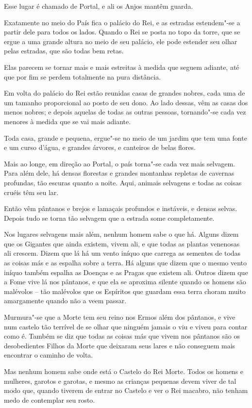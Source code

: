 Esse lugar é chamado de Portal, e ali os Anjos mantêm guarda.

Exatamente no meio do País fica o palácio do Rei, e as estradas
estendem"-se a partir dele para todos os lados. Quando o Rei se posta no
topo da torre, que se ergue a uma grande altura no meio de seu palácio,
ele pode estender seu olhar pelas estradas, que são todas bem retas.

Elas parecem se tornar mais e mais estreitas à medida que seguem
adiante, até que por fim se perdem totalmente na pura distância.

Em volta do palácio do Rei estão reunidas casas de grandes nobres, cada
uma de um tamanho proporcional ao posto de seu dono. Ao lado dessas, vêm
as casas dos menos nobres; e depois aquelas de todas as outras pessoas,
tornando"-se cada vez menores à medida que se vai mais adiante.

Toda casa, grande e pequena, ergue"-se no meio de um jardim que tem uma
fonte e um curso d'água, e grandes árvores, e canteiros de belas flores.

Mais ao longe, em direção ao Portal, o país torna"-se cada vez mais
selvagem. Para além dele, há densas florestas e grandes montanhas
repletas de cavernas profundas, tão escuras quanto a noite. Aqui,
animais selvagens e todas as coisas cruéis têm seu lar.

Então vêm pântanos e brejos e lamaçais profundos e instáveis, e densas
selvas. Depois tudo se torna tão selvagem que a estrada some
completamente.

Nos lugares selvagens mais além, nenhum homem sabe o que há. Alguns
dizem que os Gigantes que ainda existem, vivem ali, e que todas as
plantas venenosas ali crescem. Dizem que lá há um vento iníquo que
carrega as sementes de todas as coisas más e as espalha sobre a terra.
Há alguns que dizem que o mesmo vento iníquo também espalha as Doenças e
as Pragas que existem ali. Outros dizem que a Fome vive lá nos pântanos,
e que ela se aproxima silente quando os homens são malévolos -- tão
malévolos que os Espíritos que guardam essa terra choram muito
amargamente quando não a veem passar.

Murmura"-se que a Morte tem seu reino nos Ermos além dos pântanos, e vive
num castelo tão terrível de se olhar que ninguém jamais o viu e viveu
para contar como é. Também se diz que todas as coisas más que vivem nos
pântanos são os desobedientes Filhos da Morte que deixaram seus lares e
não conseguem mais encontrar o caminho de volta.

Mas nenhum homem sabe onde está o Castelo do Rei Morte. Todos os homens
e mulheres, garotos e garotas, e mesmo as crianças pequenas devem viver
de tal modo que, quando tiverem de entrar no Castelo e ver o Rei
macabro, não tenham medo de contemplar seu rosto.

